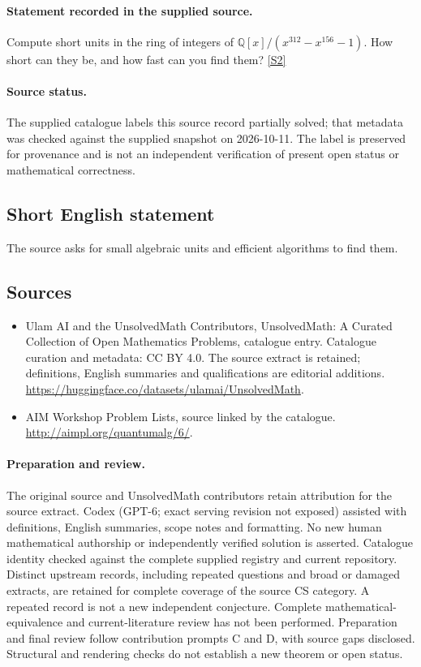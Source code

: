 \documentclass[11pt]{article}
\begin{document}
\paragraph{Statement recorded in the supplied source.}
Compute short units in the ring of integers of $\mathbb Q[x]/(x^{312} - x^{156} -1)$. How short can they be, and how fast can you find them? \href{http://aimpl.org/quantumalg/6/}{[S2]}
\paragraph{Source status.}
The supplied catalogue labels this source record partially solved; that metadata was checked against the supplied snapshot on 2026-10-11. The label is preserved for provenance and is not an independent verification of present open status or mathematical correctness.
\subsection{Short English statement}
The source asks for small algebraic units and efficient algorithms to find them.
\subsection{Sources}
\begin{itemize}
\item[S1] Ulam AI and the UnsolvedMath Contributors, UnsolvedMath: A Curated Collection of Open Mathematics Problems, catalogue entry. Catalogue curation and metadata: CC BY 4.0. The source extract is retained; definitions, English summaries and qualifications are editorial additions.
\url{https://huggingface.co/datasets/ulamai/UnsolvedMath}.
\item[S2] AIM Workshop Problem Lists, source linked by the catalogue.
\url{http://aimpl.org/quantumalg/6/}.
\end{itemize}
\paragraph{Preparation and review.}
The original source and UnsolvedMath contributors retain attribution for the source extract. Codex (GPT-6; exact serving revision not exposed) assisted with definitions, English summaries, scope notes and formatting. No new human mathematical authorship or independently verified solution is asserted. Catalogue identity checked against the complete supplied registry and current repository. Distinct upstream records, including repeated questions and broad or damaged extracts, are retained for complete coverage of the source CS category. A repeated record is not a new independent conjecture. Complete mathematical-equivalence and current-literature review has not been performed. Preparation and final review follow contribution prompts C and D, with source gaps disclosed. Structural and rendering checks do not establish a new theorem or open status.
\label{end:statement}
\end{document}
